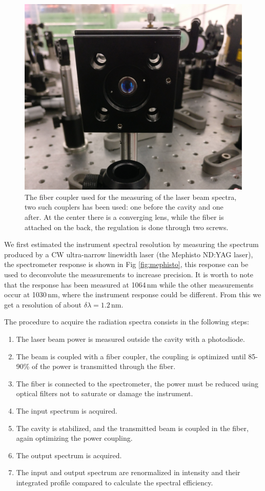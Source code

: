 \begin{figure}
	\centering
	\includegraphics[width=0.8\linewidth]{images/foto/coupler.jpg}
	\caption{The fiber coupler used for the measuring of the laser beam spectra, two such couplers has been used: one before the cavity and one after. At the center there is a converging lens, while the fiber is attached on the back, the regulation is done through two screws.}
	\label{fig:coupler}
\end{figure}

We first estimated the instrument spectral resolution by measuring the spectrum produced by a CW ultra-narrow linewidth laser (the Mephisto ND:YAG laser), the spectrometer response is shown in Fig \ref{fig:mephisto}, this response can be used to deconvolute the measurements to increase precision. It is worth to note that the response has been measured at 1064\,nm while the other measurements occur at 1030\,nm, where the instrument response could be different. From this we get a resolution of about $\delta \lambda =1.2$\,nm.

The procedure to acquire the radiation spectra consists in the following steps:
\begin{enumerate}
	\item The laser beam power is measured outside the cavity with a photodiode.
	\item The beam is coupled with a fiber coupler, the coupling is optimized until 85-90\% of the power is transmitted through the fiber.
	\item The fiber is connected to the spectrometer, the power must be reduced using optical filters not to saturate or damage the instrument.
	\item The input spectrum is acquired.
	\item The cavity is stabilized, and the transmitted beam is coupled in the fiber, again optimizing the power coupling.
	\item The output spectrum is acquired.
	\item The input and output spectrum are renormalized in intensity and their integrated profile compared to calculate the spectral efficiency.
\end{enumerate}

